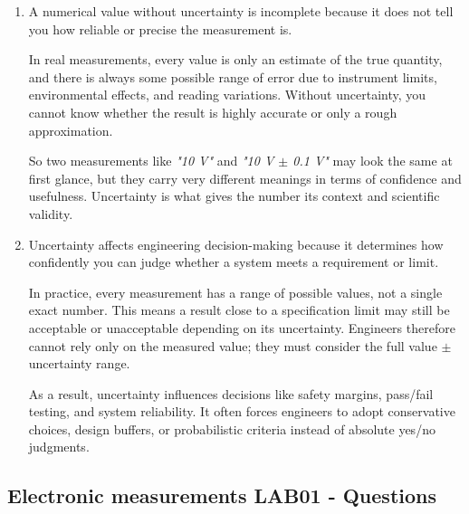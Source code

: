 \documentclass[../main.tex]{subfiles}
\begin{document}
\begin{enumerate}[label=\textbf{\arabic*.}]
	\item A numerical value without uncertainty is incomplete because it does not tell you how reliable or precise the measurement is.

	In real measurements, every value is only an estimate of the true quantity, and there is always some possible range of error due to instrument limits, environmental effects, and reading variations. Without uncertainty, you cannot know whether the result is highly accurate or only a rough approximation.

	So two measurements like \textit{"10 V"} and \textit{"10 V $\pm$ 0.1 V"} may look the same at first glance, but they carry very different meanings in terms of confidence and usefulness. Uncertainty is what gives the number its context and scientific validity.


	\item Uncertainty affects engineering decision-making because it determines how confidently you can judge whether a system meets a requirement or limit.

	In practice, every measurement has a range of possible values, not a single exact number. This means a result close to a specification limit may still be acceptable or unacceptable depending on its uncertainty. Engineers therefore cannot rely only on the measured value; they must consider the full value $\pm$ uncertainty range.

	As a result, uncertainty influences decisions like safety margins, pass/fail testing, and system reliability. It often forces engineers to adopt conservative choices, design buffers, or probabilistic criteria instead of absolute yes/no judgments.
	
\end{enumerate}

\vspace*{1.5cm}
\subsection{Electronic measurements LAB01 - Questions}
\end{document}
